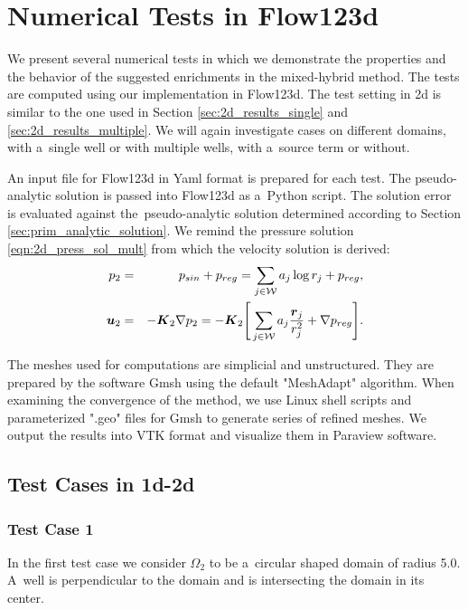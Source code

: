 \section{Numerical Tests in Flow123d}
We present several numerical tests in which we demonstrate the properties and the behavior of the suggested enrichments in the mixed-hybrid method.
The tests are computed using our implementation in Flow123d.
The test setting in 2d is similar to the one used in Section \ref{sec:2d_results_single} and \ref{sec:2d_results_multiple}.
We will again investigate cases on different domains, with a~single well or with multiple wells, with a~source term or without.

An input file for Flow123d in Yaml format is prepared for each test.
The pseudo-analytic solution is passed into Flow123d as a~Python script.
The solution error is evaluated against the~pseudo-analytic solution determined according
to Section \ref{sec:prim_analytic_solution}. We remind the pressure solution \eqref{eqn:2d_press_sol_mult} from which the velocity solution is derived:
\begin{eqnarray}
p_2 &=& p_{sin} + p_{reg} = \sum\limits_{j\in\mathcal{W}} a_j\log r_j + p_{reg}, \label{eqn:2d_press_solution}\\
\mathbf{\boldsymbol{u}}_2 &=& -\mathbf{\boldsymbol{K}}_2 \nabla p_2 = - \mathbf{\boldsymbol{K}}_2 \Bigg[ \sum\limits_{j\in\mathcal{W}} a_j\frac{\mathbf{\boldsymbol{r}}_j}{r_j^2} + \nabla p_{reg} \Bigg].  \label{eqn:2d_vel_solution}
\end{eqnarray}

The meshes used for computations are simplicial and unstructured.
They are prepared by the software Gmsh using the default "MeshAdapt" algorithm.
When examining the convergence of the method, we use Linux shell scripts and parameterized ".geo" files for Gmsh
to generate series of refined meshes.
We output the results into VTK format and visualize them in Paraview software. 

\subsection{Test Cases in 1d-2d}

\subsubsection{Test Case 1}
In the first test case we consider $\Omega_2$ to be a~circular shaped domain of radius 5.0.
A~well is perpendicular to the domain and is intersecting the domain in its center.

